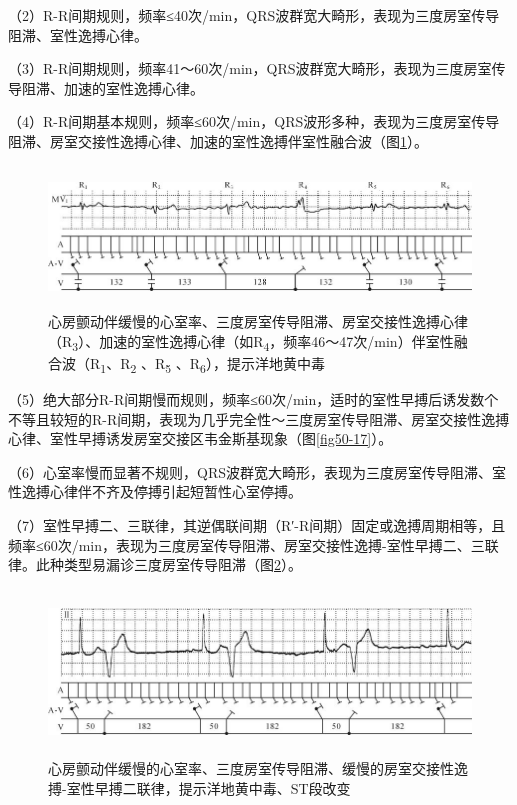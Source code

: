 （2）R-R间期规则，频率≤40次/min，QRS波群宽大畸形，表现为三度房室传导阻滞、室性逸搏心律。

（3）R-R间期规则，频率41～60次/min，QRS波群宽大畸形，表现为三度房室传导阻滞、加速的室性逸搏心律。

（4）R-R间期基本规则，频率≤60次/min，QRS波形多种，表现为三度房室传导阻滞、房室交接性逸搏心律、加速的室性逸搏伴室性融合波（图\ref{fig13-18}）。

\begin{figure}[!htbp]
 \centering
 \includegraphics[width=5.78125in,height=1.47917in]{./images/Image00226.jpg}
 \captionsetup{justification=centering}
 \caption{心房颤动伴缓慢的心室率、三度房室传导阻滞、房室交接性逸搏心律（R\textsubscript{3}）、加速的室性逸搏心律（如R\textsubscript{4}，频率46～47次/min）伴室性融合波（R\textsubscript{1}、R\textsubscript{2} 、R\textsubscript{5} 、R\textsubscript{6}），提示洋地黄中毒}
 \label{fig13-18}
  \end{figure} 


（5）绝大部分R-R间期慢而规则，频率≤60次/min，适时的室性早搏后诱发数个不等且较短的R-R间期，表现为几乎完全性～三度房室传导阻滞、房室交接性逸搏心律、室性早搏诱发房室交接区韦金斯基现象（图\ref{fig50-17}）。

（6）心室率慢而显著不规则，QRS波群宽大畸形，表现为三度房室传导阻滞、室性逸搏心律伴不齐及停搏引起短暂性心室停搏。

（7）室性早搏二、三联律，其逆偶联间期（R′-R间期）固定或逸搏周期相等，且频率≤60次/min，表现为三度房室传导阻滞、房室交接性逸搏-室性早搏二、三联律。此种类型易漏诊三度房室传导阻滞（图\ref{fig13-19}）。

\begin{figure}[!htbp]
 \centering
 \includegraphics[width=5.77083in,height=1.72917in]{./images/Image00227.jpg}
 \captionsetup{justification=centering}
 \caption{心房颤动伴缓慢的心室率、三度房室传导阻滞、缓慢的房室交接性逸搏-室性早搏二联律，提示洋地黄中毒、ST段改变}
 \label{fig13-19}
  \end{figure} 

